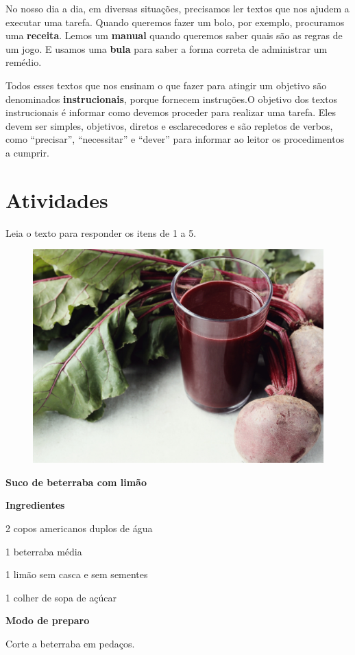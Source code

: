 \begin{conteudo}
\begin{conteudo}
\begin{conteudo}
{No nosso dia a dia, em diversas situações, precisamos ler textos que nos
ajudem a executar uma tarefa. Quando queremos fazer um bolo, por
exemplo, procuramos uma \textbf{receita}. Lemos um \textbf{manual} quando
queremos saber quais são as regras de um jogo. E usamos uma \textbf{bula} 
para saber a forma correta de administrar um remédio. 

Todos esses textos
que nos ensinam o que fazer para atingir um objetivo são
denominados \textbf{instrucionais}, porque fornecem instruções.O objetivo dos textos instrucionais é informar como devemos
proceder para realizar uma tarefa. Eles devem ser simples, objetivos,
diretos e esclarecedores e são repletos de verbos, como
``precisar'', ``necessitar'' e ``dever'' para informar ao leitor os
procedimentos a cumprir. 
}

\section*{Atividades}

Leia o texto para responder os itens de 1 a 5.


\begin{figure}[htpb!]
\centering
\includegraphics[width=.7\textwidth]{media/image10a.jpg}
\end{figure}

\begin{myquote}
\textbf{Suco de beterraba com limão}

\textbf{Ingredientes}

2 copos americanos duplos de água

1 beterraba média

1 limão sem casca e sem sementes

1 colher de sopa de açúcar

\pagebreak
\textbf{Modo de preparo}

Corte a beterraba em pedaços.


\end{myquote}
\end{conteudo}
\end{conteudo}
\end{conteudo}
